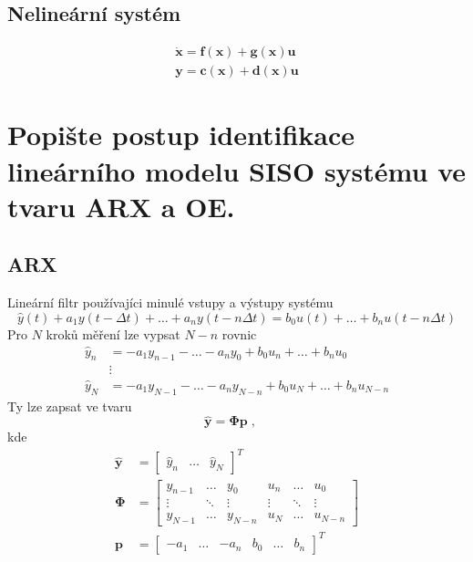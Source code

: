 \documentclass{article}
\begin{document}
	\subsection*{Nelineární systém}
	\begin{align}
		\bm{\dot{x}} = \bm{f}(\bm{x}) + \bm{g}(\bm{x})\bm{u} \\
		\bm{y} = \bm{c}(\bm{x}) + \bm{d}(\bm{x}) \bm{u}
	\end{align}

	\section{Popište postup identifikace lineárního modelu SISO systému ve tvaru ARX a OE. }
	
	\subsection{ARX}
	Lineární filtr používajíci minulé vstupy a výstupy systému
	\begin{equation}
		\hat{y}(t) + a_1 y(t-\Delta t) + \dots + a_n y(t-n\Delta t)
		=
		b_0 u(t) + \dots + b_n u(t-n\Delta t)
	\end{equation}
	Pro $N$ kroků měření lze vypsat $N-n$ rovnic
	\begin{align*}
		\hat{y}_n &= -a_1 y_{n-1} - \dots - a_n y_0 + b_0 u_n + \dots + b_n u_0 \\
		&\vdots \\
		\hat{y}_N &= -a_1 y_{N-1} - \dots - a_n y_{N-n} + b_0 u_N + \dots + b_n u_{N-n}
	\end{align*}
	Ty lze zapsat ve tvaru
	\begin{equation}
	\bm{\hat{y}} = \bm{\Phi} \bm{p}
	\;,\quad 
	\end{equation}
	kde
	\begin{align*}
		\bm{\hat{y}} &= \begin{bmatrix} \hat{y}_n & \dots & \hat{y}_N \end{bmatrix}^T
		\\ 
		\bm{\Phi}
		&=
		\begin{bmatrix}
			y_{n-1} & \dots & y_0 & u_n & \dots & u_0 \\
			\vdots & \ddots & \vdots & \vdots & \ddots & \vdots \\
			y_{N-1} & \dots & y_{N-n} & u_N & \dots & u_{N-n}
		\end{bmatrix}
		\\ 
		\bm{p} &= \begin{bmatrix} -a_1 & \dots & -a_n & b_0 & \dots & b_n \end{bmatrix}^T
	\end{align*}
\end{document}
